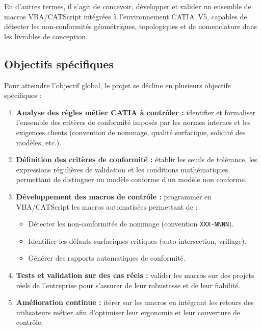En d'autres termes, il s'agit de concevoir, développer et valider un ensemble de macros VBA/CATScript intégrées à l'environnement CATIA~V5, capables de détecter les non-conformités géométriques, topologiques et de nomenclature dans les livrables de conception.

\subsection{Objectifs spécifiques}

Pour atteindre l'objectif global, le projet se décline en plusieurs objectifs spécifiques :

\begin{enumerate}
    \item \textbf{Analyse des règles métier CATIA à contrôler :} identifier et formaliser l'ensemble des critères de conformité imposés par les normes internes et les exigences clients (convention de nommage, qualité surfacique, solidité des modèles, etc.).

    \item \textbf{Définition des critères de conformité :} établir les seuils de tolérance, les expressions régulières de validation et les conditions mathématiques permettant de distinguer un modèle conforme d'un modèle non conforme.

    \item \textbf{Développement des macros de contrôle :} programmer en VBA/CATScript les macros automatisées permettant de :
    \begin{itemize}
        \item Détecter les non-conformités de nommage (convention \texttt{XXX-NNNN}).
        \item Identifier les défauts surfaciques critiques (auto-intersection, vrillage).
        \item Générer des rapports automatiques de conformité.
    \end{itemize}

    \item \textbf{Tests et validation sur des cas réels :} valider les macros sur des projets réels de l'entreprise pour s'assurer de leur robustesse et de leur fiabilité.

    \item \textbf{Amélioration continue :} itérer sur les macros en intégrant les retours des utilisateurs métier afin d'optimiser leur ergonomie et leur couverture de contrôle.
\end{enumerate}

